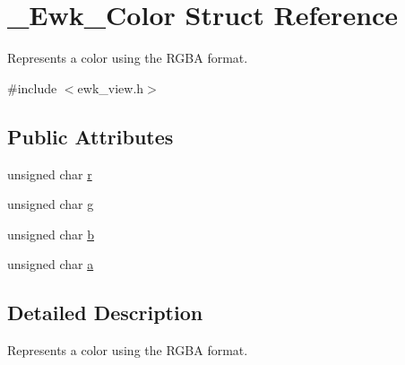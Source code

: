 \hypertarget{struct__Ewk__Color}{\section{\+\_\+\+Ewk\+\_\+\+Color Struct Reference}
\label{struct__Ewk__Color}
}


Represents a color using the R\+G\+B\+A format.  




{\ttfamily \#include $<$ewk\+\_\+view.\+h$>$}

\subsection*{Public Attributes}
\begin{DoxyCompactItemize}
\item 
unsigned char \hyperlink{struct__Ewk__Color_a928e484dad75015395e12e7a14414771}{r}
\item 
unsigned char \hyperlink{struct__Ewk__Color_afe29ab27ad8ca26a5bf58636b474fb66}{g}
\item 
unsigned char \hyperlink{struct__Ewk__Color_ac67063c69b5685a6ecd16f7221ddd91d}{b}
\item 
unsigned char \hyperlink{struct__Ewk__Color_ae672eb2b92a7976a263bc9f30b25cb05}{a}
\end{DoxyCompactItemize}


\subsection{Detailed Description}
Represents a color using the R\+G\+B\+A format. 

